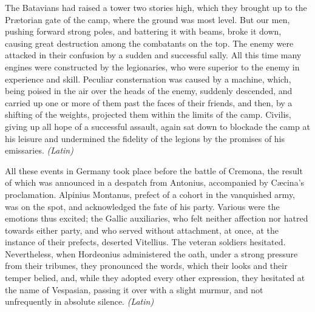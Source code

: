 
The Batavians had raised a tower two stories high, which they brought up to the Prætorian gate of the camp, where the ground was most level. But our men, pushing forward strong poles, and battering it with beams, broke it down, causing great destruction among the combatants on the top. The enemy were attacked in their confusion by a sudden and successful sally. All this time many engines were constructed by the legionaries, who were superior to the enemy in experience and skill. Peculiar consternation was caused by a machine, which, being poised in the air over the heads of the enemy, suddenly descended, and carried up one or more of them past the faces of their friends, and then, by a shifting of the weights, projected them within the limits of the camp. Civilis, giving up all hope of a successful assault, again sat down to blockade the camp at his leisure and undermined the fidelity of the legions by the promises of his emissaries. \emph{(Latin)}


All these events in Germany took place before the battle of Cremona, the result of which was announced in a despatch from Antonius, accompanied by Cæcina's proclamation. Alpinius Montanus, prefect of a cohort in the vanquished army, was on the spot, and acknowledged the fate of his party. Various were the emotions thus excited; the Gallic auxiliaries, who felt neither affection nor hatred towards either party, and who served without attachment, at once, at the instance of their prefects, deserted Vitellius. The veteran soldiers hesitated. Nevertheless, when Hordeonius administered the oath, under a strong pressure from their tribunes, they pronounced the words, which their looks and their temper belied, and, while they adopted every other expression, they hesitated at the name of Vespasian, passing it over with a slight murmur, and not unfrequently in absolute silence. \emph{(Latin)}


